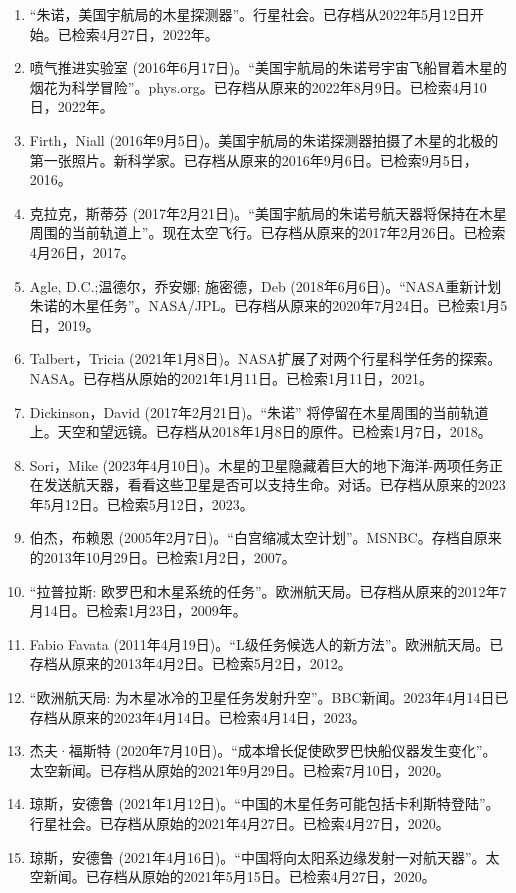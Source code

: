 \begin{enumerate}
\item “朱诺，美国宇航局的木星探测器”。行星社会。已存档从2022年5月12日开始。已检索4月27日，2022年。
\item 喷气推进实验室 (2016年6月17日)。“美国宇航局的朱诺号宇宙飞船冒着木星的烟花为科学冒险”。phys.org。已存档从原来的2022年8月9日。已检索4月10日，2022年。
\item Firth，Niall (2016年9月5日)。美国宇航局的朱诺探测器拍摄了木星的北极的第一张照片。新科学家。已存档从原来的2016年9月6日。已检索9月5日，2016。
\item 克拉克，斯蒂芬 (2017年2月21日)。“美国宇航局的朱诺号航天器将保持在木星周围的当前轨道上”。现在太空飞行。已存档从原来的2017年2月26日。已检索4月26日，2017。
\item Agle, D.C.;温德尔，乔安娜; 施密德，Deb (2018年6月6日)。“NASA重新计划朱诺的木星任务”。NASA/JPL。已存档从原来的2020年7月24日。已检索1月5日，2019。
\item Talbert，Tricia (2021年1月8日)。NASA扩展了对两个行星科学任务的探索。NASA。已存档从原始的2021年1月11日。已检索1月11日，2021。
\item Dickinson，David (2017年2月21日)。“朱诺” 将停留在木星周围的当前轨道上。天空和望远镜。已存档从2018年1月8日的原件。已检索1月7日，2018。
\item Sori，Mike (2023年4月10日)。木星的卫星隐藏着巨大的地下海洋-两项任务正在发送航天器，看看这些卫星是否可以支持生命。对话。已存档从原来的2023年5月12日。已检索5月12日，2023。
\item 伯杰，布赖恩 (2005年2月7日)。“白宫缩减太空计划”。MSNBC。存档自原来的2013年10月29日。已检索1月2日，2007。
\item “拉普拉斯: 欧罗巴和木星系统的任务”。欧洲航天局。已存档从原来的2012年7月14日。已检索1月23日，2009年。
\item Fabio Favata (2011年4月19日)。“L级任务候选人的新方法”。欧洲航天局。已存档从原来的2013年4月2日。已检索5月2日，2012。
\item “欧洲航天局: 为木星冰冷的卫星任务发射升空”。BBC新闻。2023年4月14日已存档从原来的2023年4月14日。已检索4月14日，2023。
\item 杰夫·福斯特 (2020年7月10日)。“成本增长促使欧罗巴快船仪器发生变化”。太空新闻。已存档从原始的2021年9月29日。已检索7月10日，2020。
\item 琼斯，安德鲁 (2021年1月12日)。“中国的木星任务可能包括卡利斯特登陆”。行星社会。已存档从原始的2021年4月27日。已检索4月27日，2020。
\item 琼斯，安德鲁 (2021年4月16日)。“中国将向太阳系边缘发射一对航天器”。太空新闻。已存档从原始的2021年5月15日。已检索4月27日，2020。

\end{enumerate}
